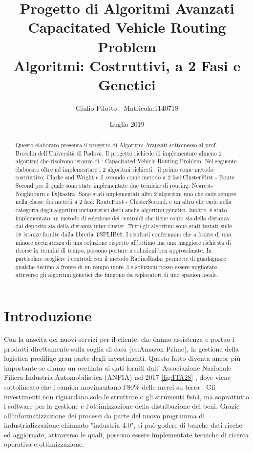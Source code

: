 \documentclass[]{article}
\title{Progetto di Algoritmi Avanzati  	
		\\ \large Capacitated Vehicle Routing Problem 
		 \\  Algoritmi: Costruttivi, a 2 Fasi e Genetici}
\author{Giulio Pilotto - Matricola:1140718}
\date{Luglio 2019}
\begin{document}
	



\maketitle


\begin{abstract}

Questo elaborato presenta il progetto di Algoritmi Avanzati sottomesso al prof. Bresolin dell'Università di Padova.
Il progetto richiede di implementare almeno 2 algoritmi che risolvono istanze di : Capacitated Vehicle Routing Problem.
Nel seguente elaborato oltre ad implementare i 2 algoritmi richiesti , il primo come metodo costruttivo; Clarke and Wright e il secondo come metodo a 2 fasi:ClusterFirst - Route Second per il quale sono state implementate due tecniche di routing: Nearest-Neighbourn e Dijkastra.
Sono stati implementati altri 2 algoritmi uno che cade sempre nella classe dei metodi a 2 fasi: RouteFirst - ClusterSecond, e un altro che cade nella categoria degli algoritmi metauristici detti anche algoritmi genetici.
Inoltre, è stato implementato un metodo di selezione dei centroidi che tiene conto sia della distanza dal deposito sia della distanza inter-cluster.
Tutti gli algoritmi sono stati testati sulle 16 istanze fornite dalla libreria TSPLIB95.
I risultati confermano che a fronte di una minore accuratezza di una soluzione rispetto all'ottimo ma una maggiore richiesta di risorse in termini di tempo, possono portare a soluzioni ben approssimate.
In particolare scegliere i centrodi con il metodo RadiusRadar permette di guadagnare qualche decimo a fronte di un tempo inore.
Le soluzioni posso essere migliorate attrverso gli algoritmi genetici che fungono da esploratori di uno spazion locale.

\end{abstract}

\section{Introduzione}
Con la nascita dei nuovi servizi per il cliente, che danno assistenza e portao i prodotti direttamente sulla soglia di casa (es:Amazon Prime), la gestione della logistica predilige gran parte degli investimenti.
Questo fatto diventa ancor più importante se diamo un occhiata ai dati forniti dall' Associazione Nazionale Filiera Industria Automobilistica (ANFIA) nel 2017 \ref{fig:ITA28} , dove viene sottolineato che i camion movimentano l'80$\%$ delle merci su terra \cite{ANFIA2017}. 
Gli investimenti non riguardano solo le strutture o gli strumenti fisici, ma soprattutto i software per la gestione e l'ottimizzazione  della distribuzione dei beni.
Grazie all'informatizzazione dei processi da parte del nuovo programma di industrializzazione chiamato "industria 4.0", si può godere di banche dati ricche ed aggiornate, attraverso le quali, possono essere implementate tecniche di ricerca operativa e ottimizzazione.
\end{document}
